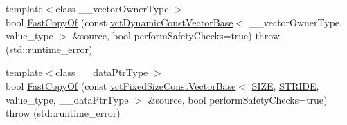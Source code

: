 \begin{DoxyCompactItemize}
\item 
{\footnotesize template$<$class \+\_\+\+\_\+vector\+Owner\+Type $>$ }\\bool \hyperlink{classvct_fixed_size_vector_base_a070fb6cbdc5c395de2f8e7e0444d5ba9}{Fast\+Copy\+Of} (const \hyperlink{classvct_dynamic_const_vector_base}{vct\+Dynamic\+Const\+Vector\+Base}$<$ \+\_\+\+\_\+vector\+Owner\+Type, value\+\_\+type $>$ \&source, bool perform\+Safety\+Checks=true)  throw (std\+::runtime\+\_\+error)
\item 
{\footnotesize template$<$class \+\_\+\+\_\+data\+Ptr\+Type $>$ }\\bool \hyperlink{classvct_fixed_size_vector_base_aa1c832d7b4483eee2d5aee6ba75f0398}{Fast\+Copy\+Of} (const \hyperlink{classvct_fixed_size_const_vector_base}{vct\+Fixed\+Size\+Const\+Vector\+Base}$<$ \hyperlink{classvct_fixed_size_vector_base_a688214b662551929a8d92e4ed7be0d42ae6389ee04e4be20faf1c7639de3202fb}{S\+I\+Z\+E}, \hyperlink{classvct_fixed_size_vector_base_ace3f97f061ae60acb29f9719787d18a3a953b66e9631c2c4ff134062e7e09a37d}{S\+T\+R\+I\+D\+E}, value\+\_\+type, \+\_\+\+\_\+data\+Ptr\+Type $>$ \&source, bool perform\+Safety\+Checks=true)  throw (std\+::runtime\+\_\+error)
\end{DoxyCompactItemize}

